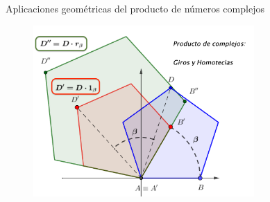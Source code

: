 \begin{myexampleblock}{Aplicaciones geométricas del producto de números complejos}
\begin{figure}[H]
	\centering
	\includegraphics[width=0.75\textwidth]{img-c/comp10.png}
\end{figure}
\end{myexampleblock}	


